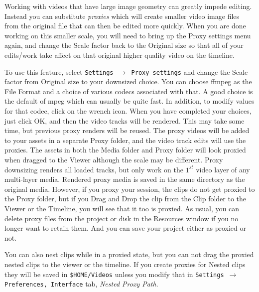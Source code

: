 Working with videos that have large image geometry can greatly impede editing.  Instead you can substitute \textit{proxies} which will create smaller video image files from the original file that can then be edited more quickly.   When you are done working on this smaller scale, you will need to bring up the Proxy settings menu again, and change the Scale factor back to the Original size so that all of your edits/work take affect on that original higher quality video on the timeline.  

To use this feature, select \texttt{Settings $\rightarrow$ Proxy settings} and change the Scale factor from Original size to your downsized choice.  You can choose ffmpeg as the File Format and a choice of various codecs associated with that.  A good choice is the default of mpeg which can usually be quite fast.  In addition, to modify values for that codec, click on the wrench icon.  When you have completed your choices, just click OK, and then the video tracks will be rendered. This may take some time, but previous proxy renders will be reused.  
The proxy videos will be added to your assets in a separate Proxy folder, and the video track edits will use the proxies.
The assets in both the Media folder and Proxy folder will look proxied when dragged to the Viewer although the scale may be different.
Proxy downsizing renders all loaded tracks, but only work on the $1^{st}$ video layer of any multi-layer media.  Rendered proxy media is saved in the same directory as the original media.
However, if you proxy your session, the clips do not get proxied to the Proxy folder, but if you Drag and Drop the clip from the Clip folder to the Viewer or the Timeline, you will see that it too is proxied.  
As usual, you can delete proxy files from the project or disk in the Resources window if you no longer want to retain them.
And you can save your project either as proxied or not.

You can also nest clips while in a proxied state, but you can not drag the proxied nested clips
to the viewer or the timeline.
If you create proxies for Nested clips they will be saved in \texttt{\$HOME/Videos} unless you modify that in
\texttt{Settings $\rightarrow$ Preferences, Interface} tab, \textit{Nested Proxy Path}. 

